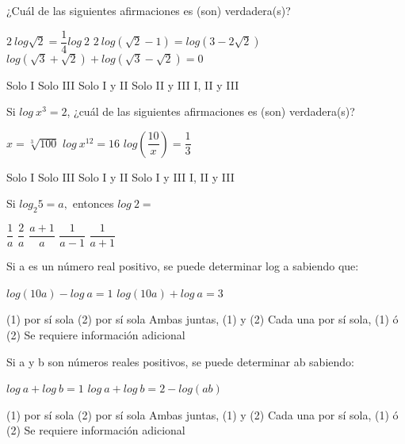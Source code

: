 \documentclass[pagina vacia]{srs}
\begin{document}
\begin{preguntas}
\pregunta ¿Cuál de las siguientes afirmaciones es (son) verdadera(s)?
\begin{verticali}
\alternativa $2~log\sqrt{2}=\dfrac{1}{4}log~2$
\alternativa $2~log\left(\sqrt{2}-1\right)=log\left(3-2\sqrt{2}\right)$
\alternativa $log\left(\sqrt{3}+\sqrt{2}\right)+log\left(\sqrt{3}-\sqrt{2}\right)=0$
\end{verticali}
\begin{vertical}
\alternativa Solo I
\alternativa Solo III
\alternativa Solo I y II
\alternativa Solo II y III
\alternativa I, II y III
\end{vertical}

\pregunta Si $log~x^{3}=2$, ¿cuál de las siguientes afirmaciones es (son) verdadera(s)?
\begin{verticali}
\alternativa $x=\sqrt[3]{100}$
\alternativa $log~x^{12}=16$
\alternativa $log\left(\dfrac{10}{x}\right)=\dfrac{1}{3}$
\end{verticali}
\begin{vertical}
\alternativa Solo I
\alternativa Solo III
\alternativa Solo I y II
\alternativa Solo I y III
\alternativa I, II y III
\end{vertical}

\pregunta Si $log_{2}5=a,$ entonces $log~2=$
\begin{vertical}
\alternativa $\dfrac{1}{a}$
\alternativa $\dfrac{2}{a}$
\alternativa $\dfrac{a+1}{a}$
\alternativa $\dfrac{1}{a-1}$
\alternativa $\dfrac{1}{a+1}$
\end{vertical}

\pregunta Si a es un número real positivo, se puede determinar log a sabiendo que:
\begin{verticaln}
\alternativa $log\left(10a\right)-log~a=1$
\alternativa $log\left(10a\right)+log~a=3$
\end{verticaln}
\begin{vertical}
\alternativa (1) por sí sola
\alternativa (2) por sí sola
\alternativa Ambas juntas, (1) y (2)
\alternativa Cada una por sí sola, (1) ó (2)
\alternativa Se requiere información adicional
\end{vertical}

\pregunta Si a y b son números reales positivos, se puede determinar ab sabiendo:
\begin{verticaln}
\alternativa $log~a+log~b=1$
\alternativa $log~a+log~b=2-log\left(ab\right)$
\end{verticaln}
\begin{vertical}
\alternativa (1) por sí sola
\alternativa (2) por sí sola
\alternativa Ambas juntas, (1) y (2)
\alternativa Cada una por sí sola, (1) ó (2)
\alternativa Se requiere información adicional
\end{vertical}
\end{preguntas}
\end{document}
